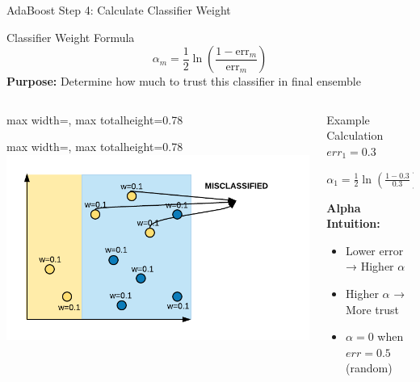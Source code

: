 \documentclass[8pt]{beamer}
\newcommand{\fitpic}[1]{\begin{adjustbox}{max width=\linewidth, max totalheight=0.78\textheight}#1\end{adjustbox}}
\begin{document}
\begin{frame}{AdaBoost Step 4: Calculate Classifier Weight}
\begin{definitionbox}{Classifier Weight Formula}
$$\alpha_m = \frac{1}{2}\ln\left(\frac{1 - \text{err}_m}{\text{err}_m}\right)$$
\textbf{Purpose:} Determine how much to trust this classifier in final ensemble
\end{definitionbox}

  \begin{columns}
    \begin{column}{0.5\textwidth}
      \centering
      \fitpic{\fitpic{\includegraphics[width = \textwidth]{../assets/ensemble/diagrams/ada_iter1_misclassify}}}
    \end{column}
    \begin{column}{0.5\textwidth}
\begin{examplebox}{Example Calculation}
$err_1 = 0.3$

$\alpha_1 = \frac{1}{2}\ln\left(\frac{1-0.3}{0.3}\right) = \frac{1}{2}\ln(2.33) = 0.42$
\end{examplebox}

\begin{keypointsbox}
\textbf{Alpha Intuition:}
\begin{itemize}
\item Lower error → Higher $\alpha$
\item Higher $\alpha$ → More trust
\item $\alpha = 0$ when $err = 0.5$ (random)
\end{itemize}
\end{keypointsbox}
    \end{column}
  \end{columns}
\end{frame}
\end{document}
